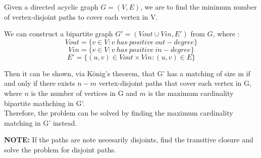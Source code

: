 Given a directed acyclic graph $G = (V, E)$, we are to find the minimum number
of vertex-disjoint paths to cover each vertex in V.

We can construct a bipartite graph $G' = (Vout \cup Vin, E' )$ from $G$, where : \\

$$ Vout = \{ v \in V : v~has~positive~out-degree \} $$
$$ Vin = \{ v \in V : v~has~positive~in-degree \} $$
$$ E' = \{ (u,v) \in Vout \times Vin : (u,v) \in E \} $$

Then it can be shown, via König's theorem, that G' has a matching of size m if
and only if there exists $n-m$ vertex-disjoint paths that cover each vertex in G,
where $n$ is the number of vertices in G and $m$ is the maximum cardinality
bipartite mathching in G'. \\

Therefore, the problem can be solved by finding the maximum cardinality matching in G' instead.

\textbf{NOTE:} If the paths are note necesarily disjoints, find the transitive closure
and solve the problem for disjoint paths.
